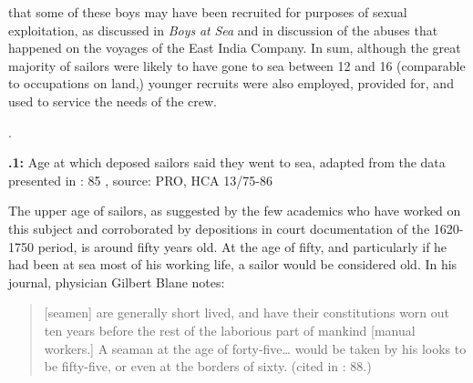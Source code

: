 that some of these boys may have been recruited for purposes of sexual exploitation, as discussed in  \textit{Boys} \textit{at} \textit{Sea} and in  discussion of the abuses that happened on the voyages of the East India Company. In sum, although the great majority of sailors were likely to have gone to sea between 12 and 16 (comparable to occupations on land,) younger recruits were also employed, provided for, and used to service the needs of the crew.

.

\textbf{.1:} Age at which deposed sailors said they went to sea, adapted from the data presented in \citealt{Earle1998}: 85 , source: PRO, HCA 13/75-86

 

The upper age of sailors, as suggested by the few academics who have worked on this subject and corroborated by depositions in court documentation of the 1620-1750 period, is around fifty years old. At the age of fifty, and particularly if he had been at sea most of his working life, a sailor would be considered old.  In his journal, physician Gilbert Blane notes:

\begin{quotation}
[seamen] are generally short lived, and have their constitutions worn out ten years before the rest of the laborious part of mankind [manual workers.] A seaman at the age of forty-five… would be taken by his looks to be fifty-five, or even at the borders of sixty. (cited in \citealt{AdkinsAdkins2008}: 88.) \end{quotation}

